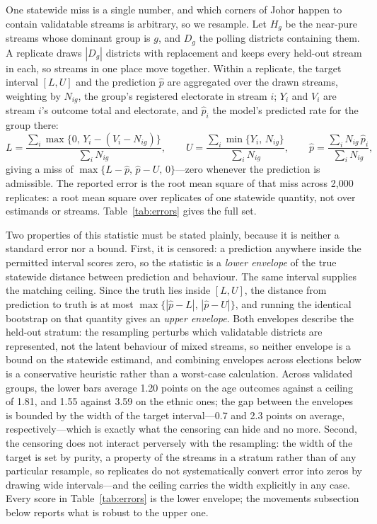 \documentclass[11pt]{article}
\begin{document}
One statewide miss is a single number, and which corners of Johor happen to contain validatable streams is arbitrary, so we resample. Let $H_g$ be the near-pure streams whose dominant group is $g$, and $D_g$ the polling districts containing them. A replicate draws $|D_g|$ districts with replacement and keeps every held-out stream in each, so streams in one place move together. Within a replicate, the target interval $[L, U]$ and the prediction $\hat p$ are aggregated over the drawn streams, weighting by $N_{ig}$, the group's registered electorate in stream $i$; $Y_i$ and $V_i$ are stream $i$'s outcome total and electorate, and $\hat p_i$ the model's predicted rate for the group there:
\begin{equation}
	L = \frac{\sum_i \max\{0,\, Y_i - (V_i - N_{ig})\}}{\sum_i N_{ig}}, \qquad
	U = \frac{\sum_i \min\{Y_i,\, N_{ig}\}}{\sum_i N_{ig}}, \qquad
	\hat p = \frac{\sum_i N_{ig}\, \hat p_i}{\sum_i N_{ig}},
	\label{eq:aggmiss}
\end{equation}
giving a miss of $\max\{L - \hat p,\, \hat p - U,\, 0\}$---zero whenever the prediction is admissible. The reported error is the root mean square of that miss across 2,000 replicates: a root mean square over replicates of one statewide quantity, not over estimands or streams. Table~\ref{tab:errors} gives the full set.



Two properties of this statistic must be stated plainly, because it is neither a standard error nor a bound. First, it is censored: a prediction anywhere inside the permitted interval scores zero, so the statistic is a \emph{lower envelope} of the true statewide distance between prediction and behaviour. The same interval supplies the matching ceiling. Since the truth lies inside $[L, U]$, the distance from prediction to truth is at most $\max\{|\hat p - L|,\, |\hat p - U|\}$, and running the identical bootstrap on that quantity gives an \emph{upper envelope}. Both envelopes describe the held-out stratum: the resampling perturbs which validatable districts are represented, not the latent behaviour of mixed streams, so neither envelope is a bound on the statewide estimand, and combining envelopes across elections below is a conservative heuristic rather than a worst-case calculation. Across validated groups, the lower bars average 1.20 points on the age outcomes against a ceiling of 1.81, and 1.55 against 3.59 on the ethnic ones; the gap between the envelopes is bounded by the width of the target interval---0.7 and 2.3 points on average, respectively---which is exactly what the censoring can hide and no more. Second, the censoring does not interact perversely with the resampling: the width of the target is set by purity, a property of the streams in a stratum rather than of any particular resample, so replicates do not systematically convert error into zeros by drawing wide intervals---and the ceiling carries the width explicitly in any case. Every score in Table~\ref{tab:errors} is the lower envelope; the movements subsection below reports what is robust to the upper one.
\end{document}
